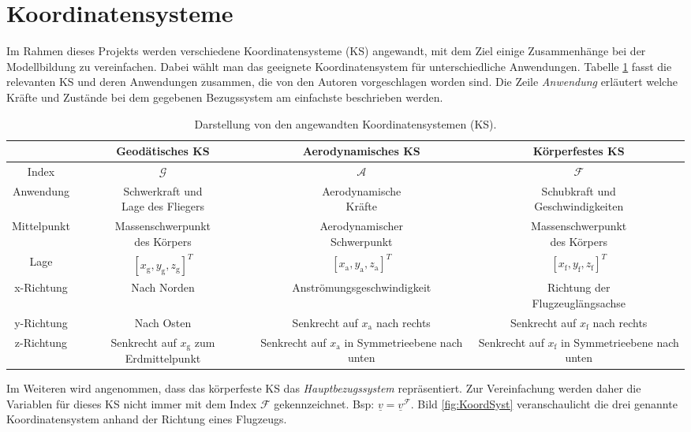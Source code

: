 \section{Koordinatensysteme}
Im Rahmen dieses Projekts werden verschiedene Koordinatensysteme (KS) angewandt, mit dem Ziel einige Zusammenhänge bei der Modellbildung zu vereinfachen. Dabei wählt man das geeignete Koordinatensystem für unterschiedliche Anwendungen. Tabelle \ref{tab:KoordSystem} fasst die relevanten KS und deren Anwendungen zusammen, die von den Autoren \cite{FlugmechanikBuch} vorgeschlagen worden sind. Die Zeile \textit{Anwendung} erläutert welche Kräfte und Zustände bei dem gegebenen Bezugssystem am einfachste beschrieben werden.
\begin{table}[h]
 \begin{tabular}{||c c c c ||} 
 \hline
 &Geodätisches KS  & Aerodynamisches KS & Körperfestes KS\\ [0.5ex] 
\hline
Index&$\mathcal{G}$  & $\mathcal{A}$ & $\mathcal{F}$\\
\hline
Anwendung&  \makecell{Schwerkraft und \\Lage des Fliegers} &  \makecell{Aerodynamische\\ Kräfte} &  \makecell{Schubkraft und \\Geschwindigkeiten} \\
\hline
Mittelpunkt& \makecell{Massenschwerpunkt\\ des Körpers} &  \makecell{Aerodynamischer \\Schwerpunkt} &  \makecell{Massenschwerpunkt\\ des Körpers}\\
\hline
Lage &$[x_\mathrm{g},y_\mathrm{g},z_\mathrm{g}]^T$  & $[x_\mathrm{a},y_\mathrm{a},z_\mathrm{a}]^T$ &$[x_\mathrm{f},y_\mathrm{f},z_\mathrm{f}]^T$\\
\hline
x-Richtung& Nach Norden    & Anströmungsgeschwindigkeit &  \makecell{Richtung der\\ Flugzeuglängsachse}\\
\hline
y-Richtung& Nach Osten  &  \makecell{Senkrecht auf $x_\mathrm{a}$\\ nach rechts}  &  \makecell{Senkrecht auf $x_\mathrm{f}$\\ nach rechts}\\
\hline
z-Richtung & \makecell{Senkrecht auf $x_\mathrm{g}$\\ zum Erdmittelpunkt}& \makecell{Senkrecht auf $x_\mathrm{a}$ \\in Symmetrieebene nach unten}&  \makecell{Senkrecht auf $x_\mathrm{f}$\\in Symmetrieebene nach unten}\\ [1ex] 
 \hline
\end{tabular}
\caption{Darstellung von den angewandten Koordinatensystemen (KS).}
\label{tab:KoordSystem}
\end{table}
Im Weiteren wird angenommen, dass das körperfeste KS das \textit{Hauptbezugssystem} repräsentiert. Zur Vereinfachung werden daher die Variablen für dieses KS nicht immer mit dem Index $\mathcal{F}$ gekennzeichnet. Bsp: $\underline{v} = \underline{v}^\mathcal{F}.$ Bild \ref{fig:KoordSyst} veranschaulicht die drei genannte Koordinatensystem anhand der Richtung eines Flugzeugs.

